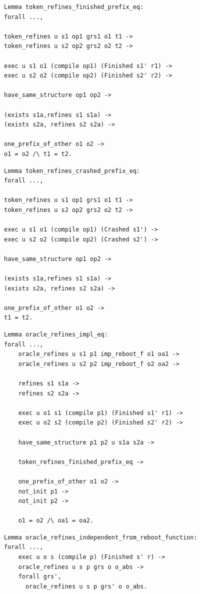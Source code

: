 \begin{verbatim}
Lemma token_refines_finished_prefix_eq:
forall ...,

token_refines u s1 op1 grs1 o1 t1 ->
token_refines u s2 op2 grs2 o2 t2 ->

exec u s1 o1 (compile op1) (Finished s1' r1) ->
exec u s2 o2 (compile op2) (Finished s2' r2) ->

have_same_structure op1 op2 -> 

(exists s1a,refines s1 s1a) ->
(exists s2a, refines s2 s2a) ->

one_prefix_of_other o1 o2 ->
o1 = o2 /\ t1 = t2.
\end{verbatim}

\begin{verbatim}
Lemma token_refines_crashed_prefix_eq:
forall ...,

token_refines u s1 op1 grs1 o1 t1 ->
token_refines u s2 op2 grs2 o2 t2 ->

exec u s1 o1 (compile op1) (Crashed s1') ->
exec u s2 o2 (compile op2) (Crashed s2') ->

have_same_structure op1 op2 -> 

(exists s1a,refines s1 s1a) ->
(exists s2a, refines s2 s2a) ->

one_prefix_of_other o1 o2 ->
t1 = t2.
\end{verbatim}

\begin{verbatim}
Lemma oracle_refines_impl_eq:
forall ...,
    oracle_refines u s1 p1 imp_reboot_f o1 oa1 ->
    oracle_refines u s2 p2 imp_reboot_f o2 oa2 ->
    
    refines s1 s1a ->
    refines s2 s2a ->
    
    exec u o1 s1 (compile p1) (Finished s1' r1) ->
    exec u o2 s2 (compile p2) (Finished s2' r2) ->
    
    have_same_structure p1 p2 u s1a s2a ->
    
    token_refines_finished_prefix_eq ->
    
    one_prefix_of_other o1 o2 ->
    not_init p1 ->
    not_init p2 ->
    
    o1 = o2 /\ oa1 = oa2.
\end{verbatim}

\begin{verbatim}
Lemma oracle_refines_independent_from_reboot_function:
forall ...,
    exec u o s (compile p) (Finished s' r) ->
    oracle_refines u s p grs o o_abs ->
    forall grs', 
      oracle_refines u s p grs' o o_abs.
\end{verbatim}


